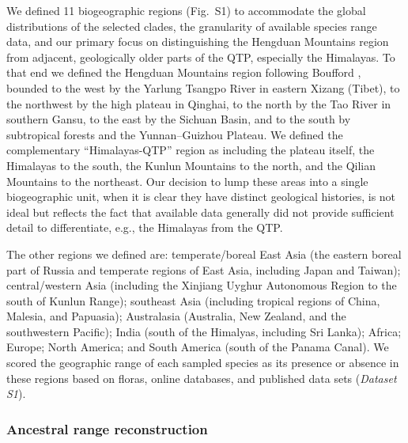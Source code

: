 We defined 11 biogeographic regions (Fig.~S1) to accommodate the global distributions of the selected clades, the granularity of available species range data, and our primary focus on distinguishing the Hengduan Mountains region from adjacent, geologically older parts of the QTP, especially the Himalayas. To that end we defined the Hengduan Mountains region following Boufford \citep{Boufford2014}, bounded to the west by the Yarlung Tsangpo River in eastern Xizang (Tibet), to the northwest by the high plateau in Qinghai, to the north by the Tao River in southern Gansu, to the east by the Sichuan Basin, and to the south by subtropical forests and the Yunnan–Guizhou Plateau. We defined the complementary ``Himalayas-QTP'' region as including the plateau itself, the Himalayas to the south, the Kunlun Mountains to the north, and the Qilian Mountains to the northeast. Our decision to lump these areas into a single biogeographic unit, when it is clear they have distinct geological histories, is not ideal but reflects the fact that available data generally did not provide sufficient detail to differentiate, e.g., the Himalayas from the QTP.

The other regions we defined are: temperate/boreal East Asia (the eastern boreal part of Russia and temperate regions of East Asia, including Japan and Taiwan); central/western Asia (including the Xinjiang Uyghur Autonomous Region to the south of Kunlun Range); southeast Asia (including tropical regions of China, Malesia, and Papuasia); Australasia (Australia, New Zealand, and the southwestern Pacific); India (south of the Himalyas, including Sri Lanka); Africa; Europe; North America; and South America (south of the Panama Canal). We scored the geographic range of each sampled species as its presence or absence in these regions based on floras, online databases, and published data sets (\textit{Dataset S1}).

\subsubsection*{Ancestral range reconstruction}

